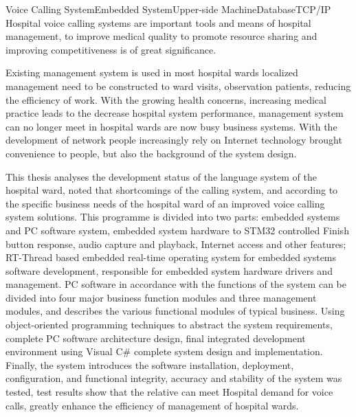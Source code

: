 
\begin{Eabstract}{Voice Calling System}{Embedded System}{Upper-side Machine}{Database}{TCP/IP}
Hospital voice calling systems are important tools and means of hospital management, to improve medical quality to promote resource sharing and improving competitiveness is of great significance.

Existing management system is used in most hospital wards localized management need to be constructed to ward visits, observation patients, reducing the efficiency of work. With the growing health concerns, increasing medical practice leads to the decrease hospital system performance, management system can no longer meet in hospital wards are now busy business systems. With the development of network people increasingly rely on Internet technology brought convenience to people, but also the background of the system design.

This thesis analyses the development status of the language system of the hospital ward, noted that shortcomings of the calling system, and according to the specific business needs of the hospital ward of an improved voice calling system solutions. This programme is divided into two parts: embedded systems and PC software system, embedded system hardware to STM32 controlled Finish button response, audio capture and playback, Internet access and other features; RT-Thread based embedded real-time operating system for embedded systems software development, responsible for embedded system hardware drivers and management. PC software in accordance with the functions of the system can be divided into four major business function modules and three management modules, and describes the various functional modules of typical business. Using object-oriented programming techniques to abstract the system requirements, complete PC software architecture design, final integrated development environment using Visual C{\#} complete system design and implementation. Finally, the system introduces the software installation, deployment, configuration, and functional integrity, accuracy and stability of the system was tested, test results show that the relative can meet Hospital demand for voice calls, greatly enhance the efficiency of management of hospital wards.
\end{Eabstract}
